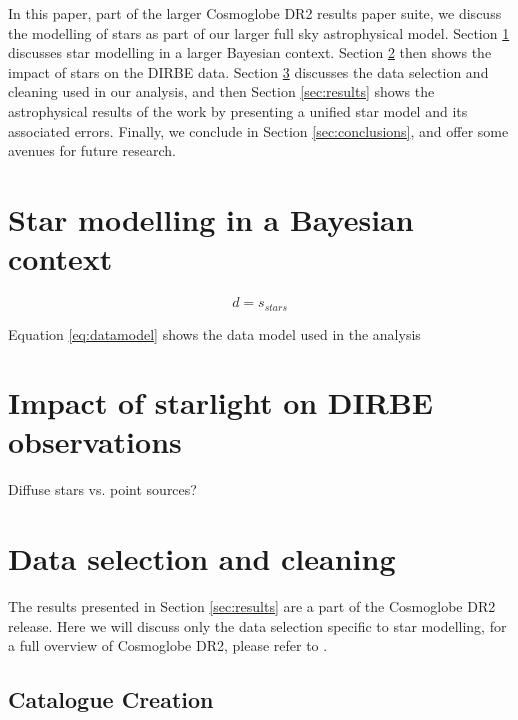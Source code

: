 \documentclass{aa}
\begin{document}
In this paper, part of the larger Cosmoglobe DR2 results paper suite, we discuss the modelling of stars as part of our larger full sky astrophysical model. Section \ref{sec:models} discusses star modelling in a larger Bayesian context. Section \ref{sec:impact} then shows the impact of stars on the DIRBE data. Section \ref{sec:data} discusses the data selection and cleaning used in our analysis, and then Section \ref{sec:results} shows the astrophysical results of the work by presenting a unified star model and its associated errors. Finally, we conclude in Section \ref{sec:conclusions}, and offer some avenues for future research.

\section{Star modelling in a Bayesian context}
\label{sec:models}


\begin{equation}
d = s_{stars}
\label{eq:datamodel}
\end{equation}


Equation \ref{eq:datamodel} shows the data model used in the analysis

\clearpage
\section{Impact of starlight on DIRBE observations}
\label{sec:impact}


Diffuse stars vs. point sources? 



\clearpage
\section{Data selection and cleaning}
\label{sec:data}

The results presented in Section \ref{sec:results} are a part of the Cosmoglobe DR2 release. Here we will discuss only the data selection specific to star modelling, for a full overview of Cosmoglobe DR2, please refer to  \cite{CG02_01}.

\subsection{Catalogue Creation}
\end{document}
